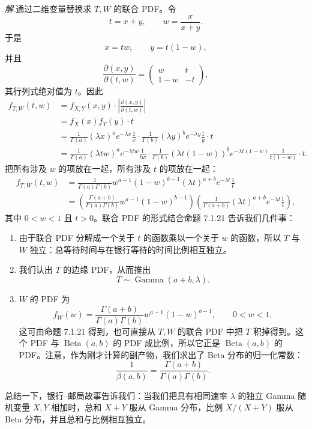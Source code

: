 \documentclass[UTF8,12pt,a4paper,fontset=fandol]{ctexart}
\begin{document}
\noindent\textit{解.}\quad 通过二维变量替换求 $T,W$ 的联合 PDF。令
\[
  t=x+y,\qquad w=\frac{x}{x+y}.
\]
于是
\[
  x=tw,\qquad y=t(1-w),
\]
并且
\[
  \frac{\partial(x,y)}{\partial(t,w)}
  =
  \begin{pmatrix}
    w & t\\
    1-w & -t
  \end{pmatrix},
\]
其行列式绝对值为 $t$。因此
\[
\begin{aligned}
  f_{T,W}(t,w)
  &=f_{X,Y}(x,y)\cdot
    \left|\frac{\partial(x,y)}{\partial(t,w)}\right|\\
  &=f_X(x)f_Y(y)\cdot t\\
  &=\frac{1}{\Gamma(a)}(\lambda x)^a e^{-\lambda x}\frac1x
    \cdot
    \frac{1}{\Gamma(b)}(\lambda y)^b e^{-\lambda y}\frac1y
    \cdot t\\
  &=\frac{1}{\Gamma(a)}(\lambda tw)^a e^{-\lambda tw}\frac1{tw}
    \cdot
    \frac{1}{\Gamma(b)}(\lambda t(1-w))^b e^{-\lambda t(1-w)}
    \frac1{t(1-w)}\cdot t.
\end{aligned}
\]
把所有涉及 $w$ 的项放在一起，所有涉及 $t$ 的项放在一起：
\[
\begin{aligned}
  f_{T,W}(t,w)
  &=
  \frac{1}{\Gamma(a)\Gamma(b)}
  w^{a-1}(1-w)^{b-1}
  (\lambda t)^{a+b}e^{-\lambda t}\frac1t\\
  &=
  \left(\frac{\Gamma(a+b)}{\Gamma(a)\Gamma(b)}
  w^{a-1}(1-w)^{b-1}\right)
  \left(\frac1{\Gamma(a+b)}(\lambda t)^{a+b}e^{-\lambda t}\frac1t\right),
\end{aligned}
\]
其中 $0<w<1$ 且 $t>0$。联合 PDF 的形式结合命题 7.1.21 告诉我们几件事：
\begin{enumerate}
  \item 由于联合 PDF 分解成一个关于 $t$ 的函数乘以一个关于 $w$ 的函数，所以 $T$ 与 $W$ 独立：总等待时间与在银行等待的时间比例相互独立。
  \item 我们认出 $T$ 的边缘 PDF，从而推出
  \[
    T\sim\operatorname{Gamma}(a+b,\lambda).
  \]
  \item $W$ 的 PDF 为
  \[
    f_W(w)=\frac{\Gamma(a+b)}{\Gamma(a)\Gamma(b)}w^{a-1}(1-w)^{b-1},
    \qquad 0<w<1,
  \]
  这可由命题 7.1.21 得到，也可直接从 $T,W$ 的联合 PDF 中把 $T$ 积掉得到。这个 PDF 与 $\operatorname{Beta}(a,b)$ 的 PDF 成比例，所以它正是 $\operatorname{Beta}(a,b)$ 的 PDF。注意，作为刚才计算的副产物，我们求出了 Beta 分布的归一化常数：
  \[
    \frac{1}{\beta(a,b)}=\frac{\Gamma(a+b)}{\Gamma(a)\Gamma(b)}.
  \]
\end{enumerate}

总结一下，银行--邮局故事告诉我们：当我们把具有相同速率 $\lambda$ 的独立 Gamma 随机变量 $X,Y$ 相加时，总和 $X+Y$ 服从 Gamma 分布，比例 $X/(X+Y)$ 服从 Beta 分布，并且总和与比例相互独立。
\end{document}
